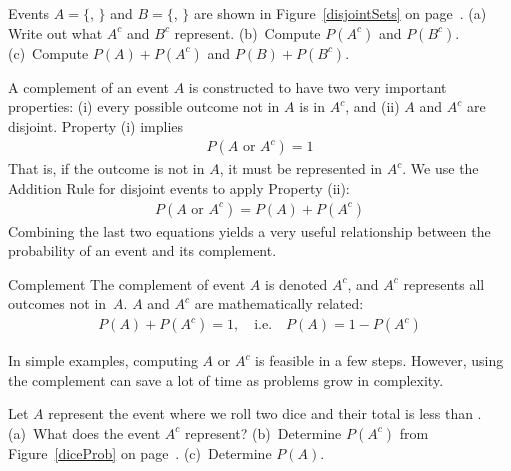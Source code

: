 \begin{exercisewrap}
\begin{nexercise}
Events $A=\{$, $\}$ and $B=\{$, $\}$ are shown in Figure~\ref{disjointSets} on page~\pageref{disjointSets}. (a) Write out what $A^c$ and $B^c$ represent. (b)~Compute $P(A^c)$ and $P(B^c)$. (c)~Compute $P(A)+P(A^c)$ and $P(B)+P(B^c)$.\footnotemark
\end{nexercise}
\end{exercisewrap}

\D{\newpage}

A complement of an event $A$ is constructed to have two very important properties: (i) every possible outcome not in $A$ is in $A^c$, and (ii) $A$ and $A^c$ are disjoint. Property (i) implies
\begin{align*}
P(A\text{ or }A^c) = 1
\end{align*}
That is, if the outcome is not in $A$, it must be represented in $A^c$. We use the Addition Rule for disjoint events to apply Property (ii):
\begin{align*}
P(A\text{ or }A^c) = P(A) + P(A^c)
\end{align*}
Combining the last two equations yields a very useful
relationship between the probability of an event and
its complement.

\begin{onebox}{Complement}
  The complement of event $A$ is denoted $A^c$, and $A^c$
  represents all outcomes not in~$A$. $A$ and $A^c$ are
  mathematically related:
  \begin{align*}
  P(A) + P(A^c) = 1, \quad\text{i.e.}\quad P(A) = 1-P(A^c)
  \end{align*}
\end{onebox}

In simple examples, computing $A$ or $A^c$ is feasible in a few steps. However, using the complement can save a lot of time as problems grow in complexity.

\begin{exercisewrap}
\begin{nexercise}
Let $A$ represent the event where we roll two dice and their total is less than . (a)~What does the event $A^c$ represent? (b)~Determine $P(A^c)$ from Figure~\ref{diceProb} on page~\pageref{diceProb}. (c)~Determine $P(A)$.\footnotemark
\end{nexercise}
\end{exercisewrap}

